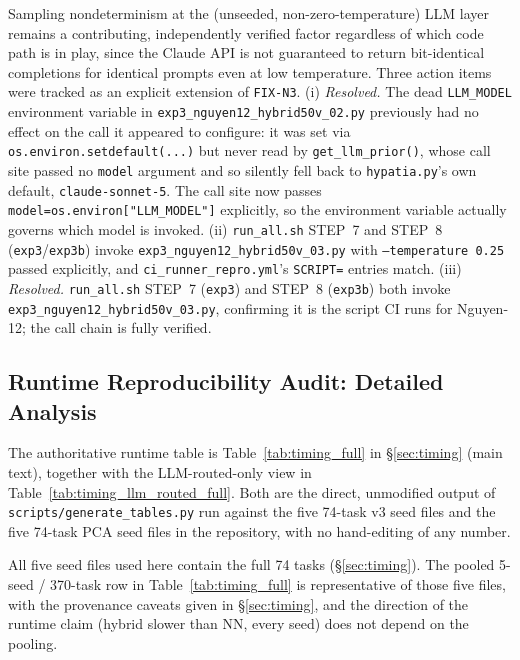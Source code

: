 \documentclass[twoside,11pt]{article}
\begin{document}
Sampling nondeterminism at the
(unseeded, non-zero-temperature) LLM layer remains a contributing,
independently verified factor regardless of which code path is in play,
since the Claude API is not guaranteed to return bit-identical completions
for identical prompts even at low temperature. Three action items were tracked as an explicit extension of
\texttt{FIX-N3}. (i) \emph{Resolved.} The dead
\texttt{LLM\_MODEL} environment variable in
\texttt{exp3\_nguyen12\_hybrid50v\_02.py} previously had no effect on
the call it appeared to configure: it was set via
\texttt{os.environ.setdefault(...)} but never read by
\texttt{get\_llm\_prior()}, whose call site passed no \texttt{model}
argument and so silently fell back to \texttt{hypatia.py}'s own default,
\texttt{claude-sonnet-5}. The call site now passes
\texttt{model=os.environ["LLM\_MODEL"]} explicitly, so the environment
variable actually governs which model is invoked. (ii) \texttt{run\_all.sh} STEP~7 and STEP~8 (\texttt{exp3}/\texttt{exp3b}) invoke
\texttt{exp3\_nguyen12\_hybrid50v\_03.py} with \texttt{--temperature 0.25} passed
explicitly, and \texttt{ci\_runner\_repro.yml}'s \texttt{SCRIPT=} entries match. (iii) \emph{Resolved.}
\texttt{run\_all.sh} STEP~7 (\texttt{exp3}) and STEP~8 (\texttt{exp3b}) both invoke
\texttt{exp3\_nguyen12\_hybrid50v\_03.py}, confirming it is the script CI runs for
Nguyen-12; the call chain is fully verified.

\subsection{Runtime Reproducibility Audit: Detailed Analysis}
The authoritative runtime table is Table~\ref{tab:timing_full} in \S\ref{sec:timing}
(main text), together with the LLM-routed-only view in
Table~\ref{tab:timing_llm_routed_full}. Both are the direct, unmodified output of
\texttt{scripts/generate\_tables.py} run against the five 74-task v3 seed files and the
five 74-task PCA seed files in the repository, with no hand-editing of any number.

All five seed files used here contain the full 74 tasks (\S\ref{sec:timing}). The pooled 5-seed / 370-task row in
Table~\ref{tab:timing_full} is representative of those five files, with the
provenance caveats given in \S\ref{sec:timing}, and the
direction of the runtime claim (hybrid slower than NN, every seed) does not
depend on the pooling.


\end{document}
